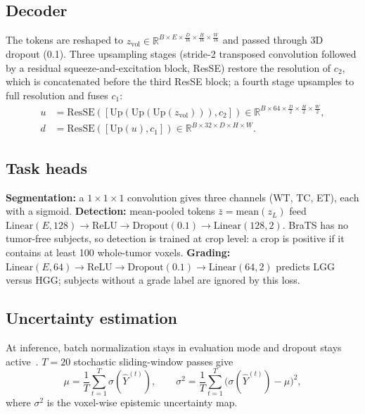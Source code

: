 \documentclass[pdflatex,sn-mathphys-num]{sn-jnl}
\begin{document}
\subsection{Decoder}
The tokens are reshaped to $z_{\mathrm{vol}}\in\mathbb{R}^{B\times E\times\frac{D}{16}\times\frac{H}{16}\times\frac{W}{16}}$ and passed through 3D dropout (0.1). Three upsampling stages (stride-2 transposed convolution followed by a residual squeeze-and-excitation block, ResSE) restore the resolution of $c_2$, which is concatenated before the third ResSE block; a fourth stage upsamples to full resolution and fuses $c_1$:
\begin{align}
u&=\mathrm{ResSE}([\mathrm{Up}(\mathrm{Up}(\mathrm{Up}(z_{\mathrm{vol}}))),c_2])\in\mathbb{R}^{B\times64\times\frac{D}{2}\times\frac{H}{2}\times\frac{W}{2}},\\
d&=\mathrm{ResSE}([\mathrm{Up}(u),c_1])\in\mathbb{R}^{B\times32\times D\times H\times W}.
\end{align}

\subsection{Task heads}
\textbf{Segmentation:} a $1\times1\times1$ convolution gives three channels (WT, TC, ET), each with a sigmoid.
\textbf{Detection:} mean-pooled tokens $\bar{z}=\mathrm{mean}(z_L)$ feed $\mathrm{Linear}(E,128)\rightarrow\mathrm{ReLU}\rightarrow\mathrm{Dropout}(0.1)\rightarrow\mathrm{Linear}(128,2)$. BraTS has no tumor-free subjects, so detection is trained at crop level: a crop is positive if it contains at least 100 whole-tumor voxels.
\textbf{Grading:} $\mathrm{Linear}(E,64)\rightarrow\mathrm{ReLU}\rightarrow\mathrm{Dropout}(0.1)\rightarrow\mathrm{Linear}(64,2)$ predicts LGG versus HGG; subjects without a grade label are ignored by this loss.

\subsection{Uncertainty estimation}
At inference, batch normalization stays in evaluation mode and dropout stays active~\cite{gal2016}. $T=20$ stochastic sliding-window passes give
\begin{equation}
\mu=\frac{1}{T}\sum_{t=1}^{T}\sigma(\hat{Y}^{(t)}),\qquad \sigma^2=\frac{1}{T}\sum_{t=1}^{T}\bigl(\sigma(\hat{Y}^{(t)})-\mu\bigr)^2,
\end{equation}
where $\sigma^2$ is the voxel-wise epistemic uncertainty map.
\end{document}
